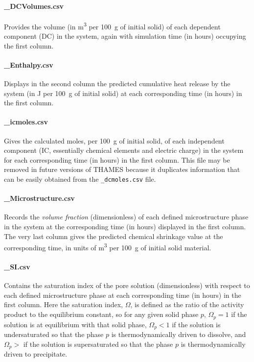 \documentclass{article}
\begin{document}
\paragraph{\_DCVolumes.csv} Provides the volume (in \unit{\meter\cubed} per
\qty{100}{\gram} of initial solid) of each dependent component (DC) in the
system, again with simulation time (in hours) occupying the first column.

\paragraph{\_Enthalpy.csv} Displays in the second column the predicted cumulative heat release
by the system (in \unit{\joule} per \qty{100}{\gram} of initial solid) at each
corresponding time (in hours) in the first column.

\paragraph{\_icmoles.csv} Gives the calculated moles, per \qty{100}{\gram}
of initial solid, of each independent
component (IC, essentially chemical elements and electric charge) in the system
for each corresponding time (in hours) in the first column. This file may be
removed in future versions of THAMES because it duplicates information that
can be easily obtained from the \verb!_dcmoles.csv! file.

\paragraph{\_Microstructure.csv} Records the \textit{volume fraction}
(dimensionless) of each defined microstructure phase in the system
at the corresponding time (in hours) displayed in the first column.
The very last column gives the predicted chemical shrinkage value at the
corresponding time, in units of \unit{\meter\cubed} per \qty{100}{\gram}
of initial solid material.

\paragraph{\_SI.csv} Contains the saturation index of the pore solution
(dimensionless) with respect to each defined microstructure phase
at each corresponding time (in hours) in the first column. Here the saturation
index, $\Omega$, is defined as the ratio of the activity product to the equilibrium
constant, so for any given solid phase $p$, $\Omega_p = 1$ if the solution is at
equilibrium with that solid phase, $\Omega_p < 1$ if the solution is
undersaturated so that the phase $p$ is thermodynamically driven to dissolve,
and $\Omega_p >$ if the solution is
supersaturated so that the phase $p$ is thermodynamically driven to precipitate.
\end{document}
